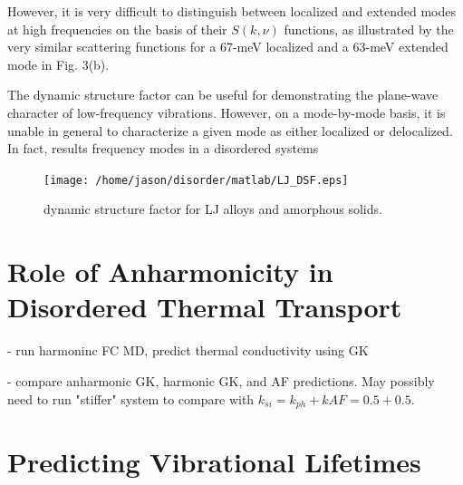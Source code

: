 \documentclass[aps,prb,preprint,superscriptaddress,amsmath,amssymb,floatfix]{revtex4}
\begin{document}
However, it is very
difficult to distinguish between localized and extended
modes at high frequencies on the basis of their $S(k,\nu)$
functions, as illustrated by the very similar scattering
functions for a 67-meV localized and a 63-meV extended
mode in Fig. 3(b). \cite{biswas_vibrational_1988}

The dynamic structure factor can be useful for demonstrating the 
plane-wave character of low-frequency vibrations.  However, on a 
mode-by-mode basis, it is unable in general to characterize a given mode 
as either localized or delocalized.  In fact, results   
frequency modes in a disordered systems

\begin{figure}
\begin{center}
\texttt{[image: /home/jason/disorder/matlab/LJ\_DSF.eps]}
\vspace*{-5mm}
\end{center}
\caption{\label{FIG:phonon_diff} dynamic structure factor for LJ alloys 
and amorphous solids.}
\end{figure}

\vspace*{100mm}

\section{\label{S-Motivation-Amorphous}Role of Anharmonicity in 
Disordered Thermal Transport}
- run harmoninc FC MD, predict thermal conductivity using GK

- compare anharmonic GK, harmonic GK, and AF predictions. May possibly 
need to run "stiffer" system to compare with 
$k_{si} = k_{ph} + k{AF} = 0.5+0.5$. 


\vspace*{100mm}


\appendix
\section{\label{A-Predicting-Phonons}Predicting Vibrational Lifetimes}
\end{document}
